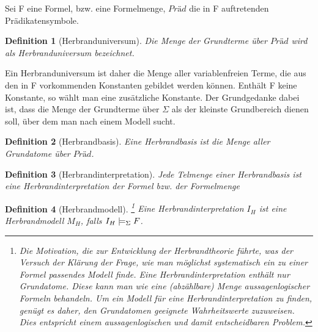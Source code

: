 \documentclass[a4paper, 11pt]{book}
\newtheorem{Def}{Definition }[section]
\begin{document}
{Sei F eine Formel, bzw. eine Formelmenge, $ Präd $ die in F auftretenden Prädikatensymbole.
\begin{Def}[Herbranduniversum]
Die Menge der Grundterme über $ Präd $ wird als Herbranduniversum bezeichnet.
\end{Def} 
 Ein Herbranduniversum ist daher die Menge aller variablenfreien Terme, die aus den in F vorkommenden Konstanten gebildet werden können. Enthält F keine Konstante, so wählt man eine zusätzliche Konstante. Der Grundgedanke dabei ist, dass die Menge der Grundterme über $ \Sigma $ als der kleinste Grundbereich dienen soll, über dem man nach einem Modell sucht. 


\begin{Def}[Herbrandbasis] 
Eine Herbrandbasis ist die Menge aller Grundatome über $ Präd $.
\end{Def}


\begin{Def}[Herbrandinterpretation] 
Jede Telmenge einer Herbrandbasis ist eine Herbrandinterpretation der Formel bzw. der Formelmenge
\end{Def}


\begin{Def}[Herbrandmodell] 
\footnote{Die Motivation, die zur Entwicklung der Herbrandtheorie führte, was der Versuch der Klärung der Frage, wie man möglichst systematisch ein zu einer Formel passendes Modell finde. Eine Herbrandinterpretation enthält nur Grundatome. Diese kann man wie eine (abzählbare) Menge aussagenlogischer Formeln behandeln. Um ein Modell für eine Herbrandinterpretation zu finden, genügt es daher, den Grundatomen geeignete Wahrheitswerte zuzuweisen. Dies entspricht einem aussagenlogischen und damit entscheidbaren Problem.}
Eine Herbrandinterpretation $ I_H $ ist eine Herbrandmodell $ M_H $, falls $ I_H \models_{\footnotesize{\Sigma}} F $.
\end{Def}


}
\end{document}
